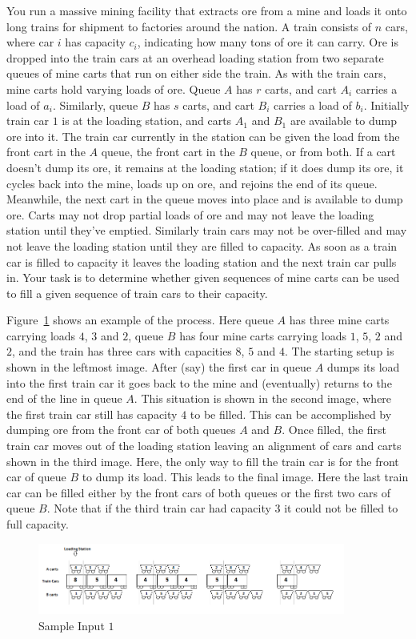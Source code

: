 \documentclass{article}
\begin{document}
    
You run a massive mining facility that extracts ore from a mine and loads it onto long trains for shipment to factories around the nation. A train consists of $n$ cars, where car $i$ has capacity $c_i$, indicating how many tons of ore it can carry. Ore is dropped into the train cars at an overhead loading station from two separate queues of mine carts that run on either side the train. As with the train cars, mine carts hold varying loads of ore. Queue $A$ has $r$ carts, and cart $A_i$ carries a load of $a_i$. Similarly, queue $B$ has $s$ carts, and cart $B_i$ carries a load of $b_i$. Initially train car $1$ is at the loading station, and carts $A_1$ and $B_1$ are available to dump ore into it. The train car currently in the station can be given the load from the front cart in the $A$ queue, the front cart in the $B$ queue, or from both. If a cart doesn't dump its ore, it remains at the loading station; if it does dump its ore, it cycles back into the mine, loads up on ore, and rejoins the end of its queue. Meanwhile, the next cart in the queue moves into place and is available to dump ore.  Carts may not drop partial loads of ore and may not leave the loading station until they've emptied.  Similarly train cars may not be over-filled and may not leave the loading station until they are filled to capacity.  As soon as a train car is filled to capacity it leaves the loading station and the next train car pulls in. Your task is to determine whether given sequences of mine carts can be used to fill a given sequence of train cars to their capacity.

Figure~\ref{fig:ore1} shows an example of the process.  Here queue $A$ has three mine carts carrying loads $4$, $3$ and $2$, queue $B$ has four mine carts carrying loads $1$, $5$, $2$ and $2$, and the train has three cars with capacities $8$, $5$ and $4$.  The starting setup is shown in the leftmost image.  After (say) the first car in queue $A$ dumps its load into the first train car it goes back to the mine and (eventually) returns to the end of the line in queue $A$.  This situation is shown in the second image, where  the first train car still has capacity $4$ to be filled.  This can be accomplished by dumping ore from the front car of both queues $A$ and $B$. Once filled, the first train car moves out of the loading station leaving an alignment of cars and carts shown in the third image.  Here, the only way to fill the train car is for the front car of queue $B$ to dump its load.  This leads to the final image.  Here the last train car can be filled either by the front cars of both queues or the first two cars of queue $B$.  Note that if the third train car had capacity $3$ it could not be filled to full capacity.
\begin{figure}[!h]
\centering
\includegraphics[width=0.9\textwidth]{ore1.png}
\caption{Sample Input $1$}
\label{fig:ore1}
\end{figure}
\end{document}
